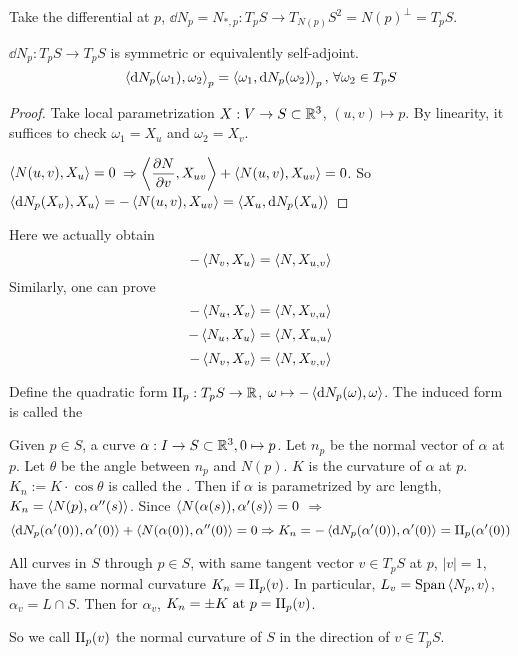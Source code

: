 Take the differential at  $ p $,  $ \dd N_p=N_{*,p}:T_pS\rightarrow T_{N(p)}S^2=N(p)^{\perp}=T_pS $.

\begin{proposition}
     $ \dd N_p:T_pS\rightarrow T_pS $ is symmetric or equivalently self-adjoint. \ie 
     \[\left<\mathrm{d} N_p(\omega_1),\omega_2\right>_p=\left<\omega_1,\mathrm{d} N_p(\omega_2)\right>_p,\,\forall \omega_2 \in T_pS\]
\end{proposition}
\begin{proof}
    Take local parametrization $ X :V\rightarrow S\subset \mathbb R^3 $,  $ (u,v)\mapsto p $.
    By linearity, it suffices to check  $ \omega_1=X_u $ and  $ \omega_2=X_v $.
    
     $ \left<N(u,v),X_u\right>=0 $  $ \Rightarrow\left<\displaystyle\frac{\partial N }{\partial v},X_{uv}\right>+\left<N(u,v),X_{uv}\right>=0 $. So  $ \left<\mathrm{d} N_p(X_v),X_u\right>=-\left<N(u,v),X_{uv}\right>=\left<X_u,\mathrm{d} N_p(X_u)\right> $ 
\end{proof}
\begin{remark}
    Here we actually obtain 
    \[-\left<N_v,X_u\right>=\left<N,X_{u,v}\right>\]
    Similarly, one can prove
    \[-\left<N_u,X_v\right>=\left<N,X_{v,u}\right>\]
    \[-\left<N_u,X_u\right>=\left<N,X_{u,u}\right>\]
    \[-\left<N_v,X_v\right>=\left<N,X_{v,v}\right>\]
\end{remark}
Define the quadratic form  $ \Romannumer2_p:T_pS\rightarrow \Rbb $,  $ \omega\mapsto -\left<\mathrm{d} N_p(\omega),\omega\right> $. The induced form is  called the   

\begin{definition}
    Given  $ p\in S $, a curve  $ \alpha:I\rightarrow S\subset \mathbb R^3, 0\mapsto p $. Let  $ n_p  $ be the normal vector of  $ \alpha  $ at  $ p  $. Let  $ \theta $ be the angle between  $ n_p $ and  $ N(p) $.  $ K  $ is the curvature of  $ \alpha  $ at  $ p $.  $ K_n:=K\cdot\cos\theta $ is called the . Then if  $ \alpha $ is parametrized by arc length,  $ K_n=\left<N(p),\alpha''(s)\right> $. Since $ \left<N(\alpha(s)),\alpha'(s)\right>=0 $ $ \Rightarrow $ 
    \[\<\dd N_p(\alpha'(0)),\alpha'(0)\>+\<N(\alpha(0)),\alpha''(0)\>=0\Rightarrow K_n=-\<\dd N_p(\alpha'(0)),\alpha'(0)\>=\Romannumer2_p(\alpha'(0))\]

    
\end{definition}
\begin{theorem}[Meusnier]\label{Meusnier theorem}
    All curves in  $ S $ through  $ p\in S $, with same tangent vector  $ v\in T_pS $ at  $ p $,  $ |v|=1 $, have the same normal curvature  $ K_n=\Romannumer2_p(v) $. In particular,  $ L_v=\mathrm{Span}\left<N_p,v\right> $,  $ \alpha_v=L\cap S $. Then for  $ \alpha_v $,  $ K_n=\pm K\text{ at }p=\Romannumer2_p(v) $. 
    
    So we call  $ \Romannumer2_p(v) $ the normal curvature of  $ S $ in the direction of  $ v\in T_pS $.  
\end{theorem}
